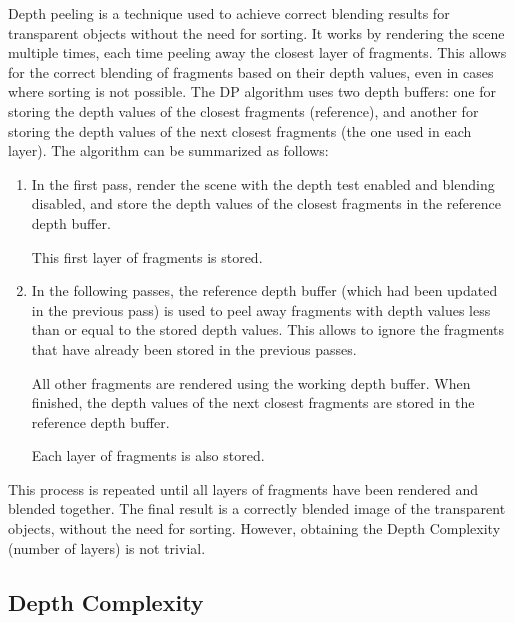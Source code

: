 Depth peeling is a technique used to achieve correct blending results for transparent objects without the need for sorting. It works by rendering the scene multiple times, each time peeling away the closest layer of fragments. This allows for the correct blending of fragments based on their depth values, even in cases where sorting is not possible. The DP algorithm uses two depth buffers: one for storing the depth values of the closest fragments (reference), and another for storing the depth values of the next closest fragments (the one used in each layer). The algorithm can be summarized as follows:
\begin{enumerate}
    \item In the first pass, render the scene with the depth test enabled and blending disabled, and store the depth values of the closest fragments in the reference depth buffer.
    
    This first layer of fragments is stored.

    \item In the following passes, the reference depth buffer (which had been updated in the previous pass) is used to peel away fragments with depth values less than or equal to the stored depth values. This allows to ignore the fragments that have already been stored in the previous passes.
    
    All other fragments are rendered using the working depth buffer. When finished, the depth values of the next closest fragments are stored in the reference depth buffer.

    Each layer of fragments is also stored.
\end{enumerate}

This process is repeated until all layers of fragments have been rendered and blended together. The final result is a correctly blended image of the transparent objects, without the need for sorting. However, obtaining the Depth Complexity (number of layers) is not trivial.
\subsection{Depth Complexity}

